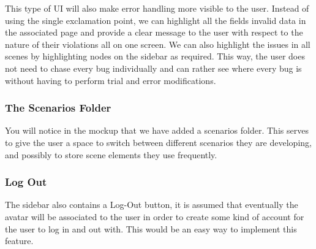 \documentclass[sigart]{acmart_mod} %
\begin{document}
This type of UI will also make error handling more visible to the user. Instead of using the single exclamation point, we can highlight all the fields invalid data in the associated page and provide a clear message to the user with respect to the nature of their violations all on one screen. We can also highlight the issues in all scenes by highlighting nodes on the sidebar as required. This way, the user does not need to chase every bug individually and can rather see where every bug is without having to perform trial and error modifications.

\subsubsection{The Scenarios Folder}
You will notice in the mockup that we have added a scenarios folder. This serves to give the user a space to switch between different scenarios they are developing, and possibly to store scene elements they use frequently.

\subsubsection{Log Out}
The sidebar also contains a Log-Out button, it is assumed that eventually the avatar will be associated to the user in order to create some kind of account for the user to log in and out with. This would be an easy way to implement this feature.
\end{document}
